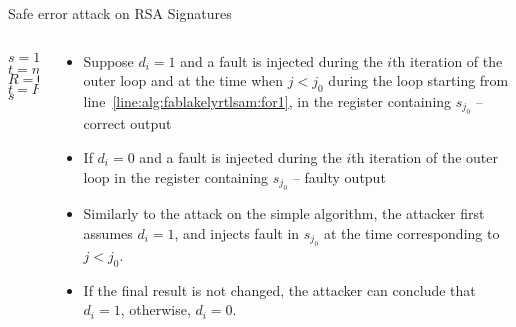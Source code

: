 \begin{frame}{Safe error attack on RSA Signatures}
\begin{columns}[T] %
\begin{column}{.45\textwidth}
{\small
{
\setlength{\interspacetitleruled}{0pt}%
\setlength{\algotitleheightrule}{0pt}%
    \begin{algorithm}[H]
$s= 1,\quad$
$t = m$\\
 	{
            $R=0$\\
            $t=R$\\
  	}
  	\Return $s$\\
\end{algorithm}}}
\end{column}%
\hfill%
\begin{column}{.58\textwidth}
\begin{itemize}
        \item Suppose $d_i=1$ and a fault is injected during the $i$th iteration of the outer loop and at the time when $j<j_0$ during the loop starting from line~\ref{line:alg:fablakelyrtlsam:for1}, in the register containing $s_{j_0}$ -- correct output 
       \item If $d_i=0$ and a fault is injected during the $i$th iteration of the outer loop in the register containing $s_{j_0}$ -- faulty output
       \item Similarly to the attack on the simple algorithm, the attacker first assumes $d_i=1$, and injects fault in $s_{j_0}$ at the time corresponding to $j<j_0$.
\item If the final result is not changed, the attacker can conclude that $d_i=1$, otherwise, $d_i=0$.
    \end{itemize}
\end{column}%
\end{columns}
\end{frame}

